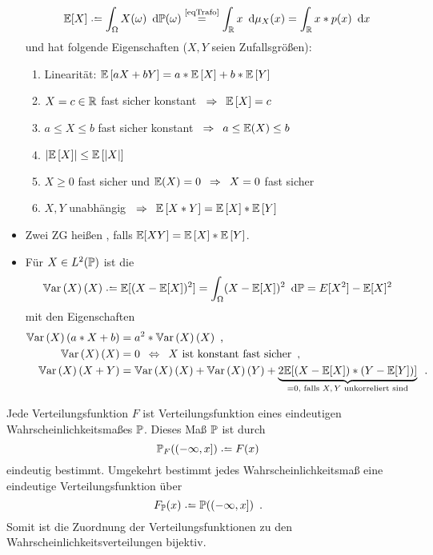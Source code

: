 \begin{itemize}[leftmargin=*]
\begin{align*}
		\E[X] \defeq \int_\Omega X(\omega) \diffskip\P(\omega) \overset{\text{\ref{eqTrafo}}}{=}
		\int_\R  x \diffskip{\mu_X(x)}
		= \int_\R  x * p(x) \diffskip x
	\end{align*}
	und hat folgende Eigenschaften ($X,Y$ seien Zufallsgrößen):
	\begin{enumerate}
		\item Linearität: $\EW[aX + bY] = a * \EW[X] + b*\EW[Y]$
		\item $X = c \in \R $ fast sicher konstant $\follows \EW[X] = c$
		\item $a \le X \le b$ fast sicher konstant $\follows a \le\E(X) \le b$
		\item $\abs{\EW[X]} \le \EW[\abs{X}]$
		\item $X \ge 0$ fast sicher und $\E(X)=0 \follows X=0$ fast sicher
		\item $X,Y$ unabhängig $\follows \EW[X*Y] = \EW[X] * \EW[Y]$
	\end{enumerate}
	\item Zwei ZG heißen , falls $\E[XY] = \EW[X] * \EW[Y]$.
	\item Für $X \in L^2(\P)$ ist die 
	\begin{equation*}
		\Var(X) \defeq \E[ (X - \E[X])^2] = \int_\Omega (X - \E[X])^2 \diffskip\P = E[X^2] - \E[X]^2
	\end{equation*}
	mit den Eigenschaften
	\begin{align*}
		\Var(a * X + b) &= a^2 * \Var(X) \komma \\
		\Var(X) &=0 \equivalent X \text{ ist konstant fast sicher} \komma \\
		\Var(X + Y) &= \Var(X) + \Var(Y) +\underbrace{2\E[(X-\E[X])*(Y-\E[Y])]}_{=0 \text{, falls $X,Y$ unkorreliert sind}} \satzende
	\end{align*}
\end{itemize}



\begin{satz}[Korrespondenzsatz]\label{satzKorrespondenzsatz}
	Jede Verteilungsfunktion $F$ ist Verteilungsfunktion eines eindeutigen Wahrscheinlichkeitsmaßes $\P$.
	Dieses Maß $\P$ ist durch
	\begin{equation*}
		\P_F((-\infty,x]) \defeq F(x)
	\end{equation*}
	eindeutig bestimmt.
	Umgekehrt bestimmt jedes Wahrscheinlichkeitsmaß eine eindeutige Verteilungsfunktion über
	\begin{equation*}
		F_{\P}(x) \defeq \P((-\infty,x]) \satzende
	\end{equation*}
	Somit ist die Zuordnung der Verteilungsfunktionen zu den Wahrscheinlichkeitsverteilungen bijektiv.
\end{satz}

